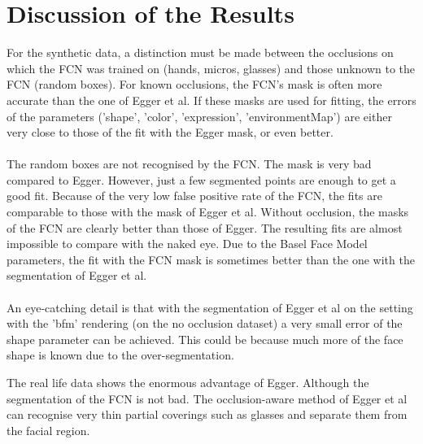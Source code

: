 \section{Discussion of the Results}
For the synthetic data, a distinction must be made between the occlusions on which the FCN was trained on (hands, micros, glasses) and those unknown to the FCN (random boxes). For known occlusions, the FCN's mask is often more accurate than the one of Egger et al. If these masks are used for fitting, the errors of the parameters ('shape', 'color', 'expression', 'environmentMap') are either very close to those of the fit with the Egger mask, or even better.\\
\\
The random boxes are not recognised by the FCN. The mask is very bad compared to Egger. However, just a few segmented points are enough to get a good fit. Because of the very low false positive rate of the FCN, the fits are comparable to those with the mask of Egger et al. Without occlusion, the masks of the FCN are clearly better than those of Egger. The resulting fits are almost impossible to compare with the naked eye. Due to the Basel Face Model parameters, the fit with the FCN mask is sometimes better than the one with the segmentation of Egger et al.\\
\\
An eye-catching detail is that with the segmentation of Egger et al on the setting with the 'bfm' rendering (on the no occlusion dataset) a very small error of the shape parameter can be achieved. This could be because much more of the face shape is known due to the over-segmentation.

The real life data shows the enormous advantage of Egger. Although the segmentation of the FCN is not bad. The occlusion-aware method of Egger et al can recognise very thin partial coverings such as glasses and separate them from the facial region.


